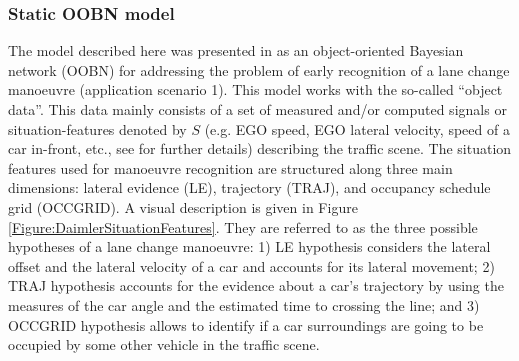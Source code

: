\subsubsection*{Static OOBN model}

The model described here was presented in \cite{kasper2012object} as an object-oriented Bayesian network (OOBN) \cite{koller1997object} for addressing the problem of early recognition of a lane change manoeuvre (application scenario 1).  This model works with the so-called ``object data''. This data mainly consists of a set of measured and/or computed signals or situation-features denoted by $S$ (e.g. EGO speed, EGO lateral velocity, speed of a car in-front, etc., see \cite{kasper2012object} for further details) describing the traffic scene. The situation features used for manoeuvre recognition are structured along three main dimensions: lateral evidence (LE), trajectory (TRAJ), and occupancy schedule grid (OCCGRID).  A visual description is given in Figure \ref{Figure:DaimlerSituationFeatures}. They are referred to as the three possible hypotheses of a lane change manoeuvre: 1) LE hypothesis considers the lateral offset and the lateral velocity of a car and accounts for its lateral movement; 2) TRAJ hypothesis accounts for the evidence about a car's trajectory by using the measures of the car angle and the estimated time to crossing the line; and 3) OCCGRID hypothesis allows to identify if a car surroundings are going to be occupied by some other vehicle in the traffic scene. 

